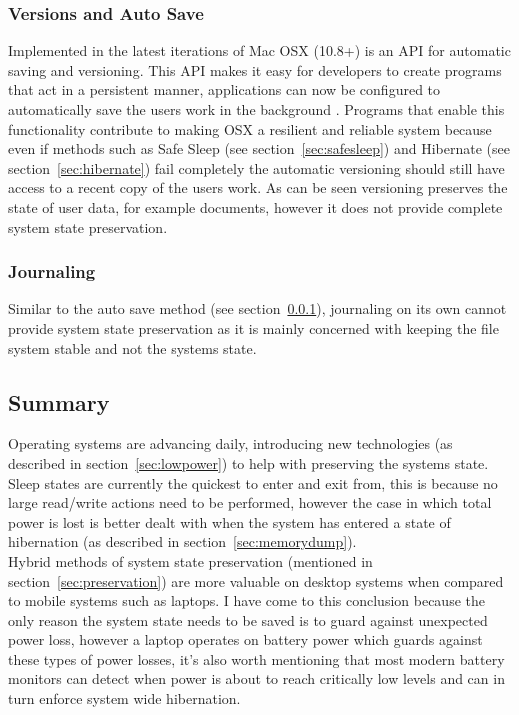 \documentclass[a4paper,12pt]{article}
\begin{document}
\subsubsection{Versions and Auto Save}\label{sec:versioning}
Implemented in the latest iterations of Mac OSX (10.8+) is an API for automatic saving and versioning. This API makes it easy for developers to create programs that act in a persistent manner, applications can now be configured to automatically save the users work in the background \citep{versioning}. 
Programs that enable this functionality contribute to making OSX a resilient and reliable system because even if methods such as Safe Sleep (see section~\ref{sec:safesleep}) and Hibernate (see section~\ref{sec:hibernate}) fail completely the automatic versioning should still have access to a recent copy of the users work. As can be seen versioning preserves the state of user data, for example documents, however it does not provide complete system state preservation.

\subsubsection{Journaling}
Similar to the auto save method (see section~\ref{sec:versioning}), journaling on its own cannot provide system  state preservation as it is mainly concerned with keeping the file system stable and not the systems state.
\citep{journaling}
\subsection{Summary}
Operating systems are advancing daily, introducing new technologies (as described in section~\ref{sec:lowpower}) to help with preserving the systems state.
\\
Sleep states are currently the quickest to enter and exit from, this is because no large read/write actions need to be performed, however the case in which total power is lost is better dealt with when the system has entered a state of hibernation (as described in section~\ref{sec:memorydump}).
\\
Hybrid methods of system state preservation (mentioned in section~\ref{sec:preservation}) are more valuable on desktop systems when compared to mobile systems such as laptops. I have come to this conclusion because the only reason the system state needs to be saved is to guard against unexpected power loss, however a laptop operates on battery power which guards against these types of power losses, it's also worth mentioning that most modern battery monitors can detect when power is about to reach critically low levels and can in turn enforce system wide hibernation.
\newpage
\end{document}
